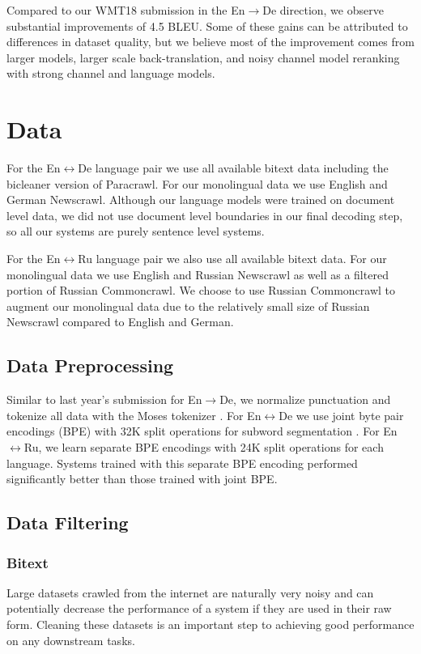 \documentclass[11pt,a4paper]{article}
\newcommand{\entode}{En$\rightarrow$De}
\newcommand{\enbide}{En$\leftrightarrow$De}
\newcommand{\enbiru}{En$\leftrightarrow$Ru}
\begin{document}
Compared to our WMT18 submission in the \entode{} direction, we observe substantial improvements of 4.5 BLEU.
Some of these gains can be attributed to differences in dataset quality, but we believe most of the improvement comes from larger models, larger scale back-translation, and noisy channel model reranking with strong channel and language models.
 
\section{Data}
For the \enbide{} language pair we use all available bitext data  including the bicleaner version of Paracrawl. 
For our monolingual data we use English and German Newscrawl. 
Although our language models were trained on document level data, we did not use document level boundaries in our final decoding step, so all our systems are purely sentence level systems.

For the \enbiru{} language pair we also use all available bitext data. 
For our monolingual data we use English and Russian Newscrawl as well as a filtered portion of Russian Commoncrawl.
We choose to use Russian Commoncrawl to augment our monolingual data due to the relatively small size of Russian Newscrawl compared to English and German.  

\subsection{Data Preprocessing}
Similar to last year's submission for \entode{}, we normalize punctuation and tokenize all data with the Moses tokenizer \cite{koehn:moses:2007}. 
For \enbide{} we use joint byte pair encodings (BPE) with 32K split operations for subword segmentation \cite{sennrich2016neural}. 
For \enbiru{}, we learn separate BPE encodings with 24K split operations for each language. 
Systems trained with this separate BPE encoding performed significantly better than those trained with joint BPE. 

\subsection{Data Filtering}
\subsubsection{Bitext}
Large datasets crawled from the internet are naturally very noisy and can potentially decrease the performance of a system if they are used in their raw form.
Cleaning these datasets is an important step to achieving good performance on any downstream tasks.
\end{document}
